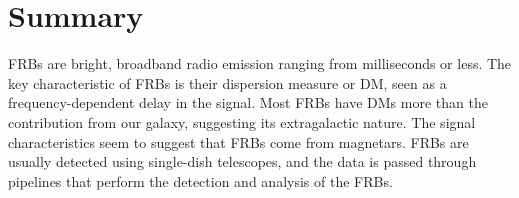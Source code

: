 \chapter{Summary}\label{summary}

FRBs are bright, broadband radio emission ranging from milliseconds or less. The key characteristic of FRBs is their dispersion measure or DM, seen as a frequency-dependent delay in the signal. Most FRBs have DMs more than the contribution from our galaxy, suggesting its extragalactic nature. The signal characteristics seem to suggest that FRBs come from magnetars. FRBs are usually detected using single-dish telescopes, and the data is passed through pipelines that perform the detection and analysis of the FRBs. 





